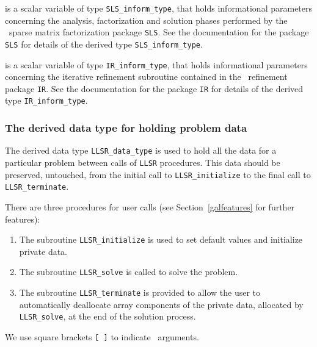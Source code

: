 \documentclass{galahad}
\newcommand{\packagename}{LLSR}
\begin{document}
\begin{description}
 is a scalar variable of type {\tt SLS\_inform\_type},
that holds informational parameters concerning the analysis, factorization
and solution phases performed by
the \galahad\ sparse matrix factorization package {\tt SLS}.
See the documentation for the package {\tt SLS} for details of the
derived type {\tt SLS\_inform\_type}.

 is a scalar variable of type {\tt IR\_inform\_type},
that holds informational parameters concerning the iterative refinement
subroutine contained in the \galahad\ refinement package {\tt IR}.
See the documentation for the package {\tt IR} for details of the
derived type {\tt IR\_inform\_type}.


\end{description}


\subsubsection{The derived data type for holding problem data}\label{typedata}
The derived data type
{\tt \packagename\_data\_type}
is used to hold all the data for a particular problem between calls of
{\tt \packagename} procedures.
This data should be preserved, untouched, from the initial call to
{\tt \packagename\_initialize}
to the final call to
{\tt \packagename\_terminate}.


\galarguments
There are three procedures for user calls
(see Section~\ref{galfeatures} for further features):

\begin{enumerate}
\item The subroutine
      {\tt \packagename\_initialize}
      is used to set default values and initialize private data.
\item The subroutine
      {\tt \packagename\_solve}
      is called to solve the problem.
\item The subroutine
      {\tt \packagename\_terminate}
      is provided to allow the user to automatically deallocate array
       components of the private data, allocated by
       {\tt \packagename\_solve},
       at the end of the solution process.
\end{enumerate}
We use square brackets {\tt [ ]} to indicate \optional\ arguments.

\end{document}
